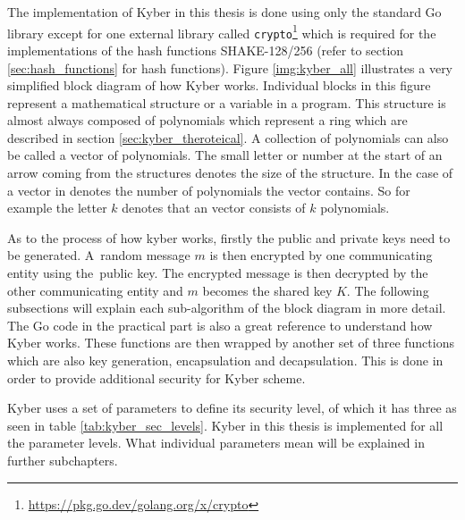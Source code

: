 The implementation of Kyber in this thesis is done using only the standard Go library except for one external library called \texttt{crypto}\footnote{\url{https://pkg.go.dev/golang.org/x/crypto}} which is required for the implementations of the hash functions SHAKE-128/256 (refer to section \ref{sec:hash_functions} for hash functions). Figure \ref{img:kyber_all} illustrates a very simplified block diagram of how Kyber works. Individual blocks in this figure represent a mathematical structure or a variable in a program. This structure is almost always composed of polynomials which represent a ring which are described in section \ref{sec:kyber_theroteical}. A collection of polynomials can also be called a vector of polynomials. The small letter or number at the start of an arrow coming from the structures denotes the size of the structure. In the case of a vector in denotes the number of polynomials the vector contains. So for example the letter $k$ denotes that an vector consists of $k$ polynomials.

As to the process of how kyber works, firstly the public and private keys need to be generated. A~random message $m$ is then encrypted by one communicating entity using the~public key. The encrypted message is then decrypted by the other communicating entity and $m$ becomes the shared key $K$. The following subsections will explain each sub-algorithm of the block diagram in more detail. The Go code in the practical part is also a great reference to understand how Kyber works. These functions are then wrapped by another set of three functions which are also key generation, encapsulation and decapsulation. This is done in order to provide additional security for Kyber scheme.


Kyber uses a set of parameters to define its security level, of which it has three as seen in table \ref{tab:kyber_sec_levels}. Kyber in this thesis is implemented for all the parameter levels. What individual parameters mean will be explained in further subchapters.
